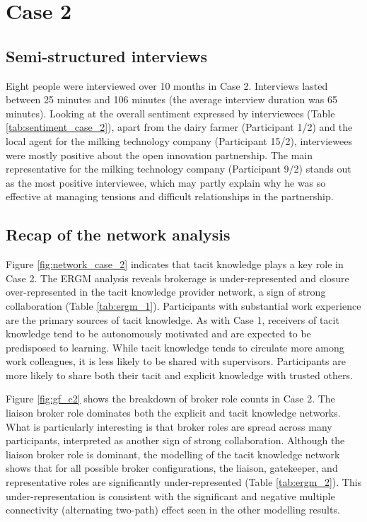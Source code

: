 \section{Case 2}

\subsection{Semi-structured interviews}

Eight people were interviewed over 10 months in Case 2. Interviews lasted between 25 minutes and 106 minutes (the average interview duration was 65 minutes). Looking at the overall sentiment expressed by interviewees (Table \ref{tab:sentiment_case_2}), apart from the dairy farmer (Participant 1/2) and the local agent for the milking technology company (Participant 15/2), interviewees were mostly positive about the open innovation partnership. The main representative for the milking technology company (Participant 9/2) stands out as the most positive interviewee, which may partly explain why he was so effective at managing tensions and difficult relationships in the partnership.

\subsection{Recap of the network analysis}

Figure \ref{fig:network_case_2} indicates that tacit knowledge plays a key role in Case 2. The ERGM analysis reveals brokerage is under-represented and closure over-represented in the tacit knowledge provider network, a sign of strong collaboration (Table \ref{tab:ergm_1}). Participants with substantial work experience are the primary sources of tacit knowledge. As with Case 1, receivers of tacit knowledge tend to be autonomously motivated and are expected to be predisposed to learning. While tacit knowledge tends to circulate more among work colleagues, it is less likely to be shared with supervisors. Participants are more likely to share both their tacit and explicit knowledge with trusted others. \medskip

Figure \ref{fig:gf_c2} shows the breakdown of broker role counts in Case 2. The liaison broker role dominates both the explicit and tacit knowledge networks. What is particularly interesting is that broker roles are spread across many participants, interpreted as another sign of strong collaboration. Although the liaison broker role is dominant, the modelling of the tacit knowledge network shows that for all possible broker configurations, the liaison, gatekeeper, and representative roles are significantly under-represented (Table \ref{tab:ergm_2}). This under-representation is consistent with the significant and negative multiple connectivity (alternating two-path) effect seen in the other modelling results.

